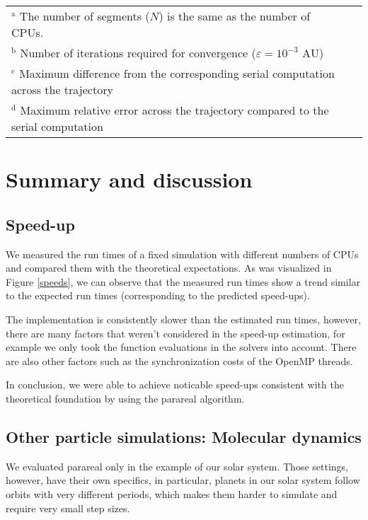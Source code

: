 \documentclass[conference]{IEEEtran}
\begin{document}
\begin{table*}[htbp]
\begin{center}
\begin{tabular}{crrrrrrrrrcc}
\bottomrule
\multicolumn{11}{l}{$^{\mathrm{a}}$ The number of segments ($N$) is the same as the number of CPUs.} \\
\multicolumn{11}{l}{$^{\mathrm{b}}$ Number of iterations required for convergence ($\varepsilon = 10^{-3}\text{ AU}$)} \\
\multicolumn{11}{l}{$^{\mathrm{c}}$ Maximum difference from the corresponding serial computation across the trajectory} \\
\multicolumn{11}{l}{$^{\mathrm{d}}$ Maximum relative error across the trajectory compared to the serial computation}
\end{tabular}
\label{runtimes}
\end{center}
\end{table*}

\section{Summary and discussion}

\subsection{Speed-up}
We measured the run times of a fixed simulation with different numbers of CPUs and compared them with the theoretical expectations. As was visualized in Figure \ref{speeds}, we can observe that the measured run times show a trend similar to the expected run times (corresponding to the predicted speed-ups). 

The implementation is consistently slower than the estimated run times, however, there are many factors that weren't considered in the speed-up estimation, for example we only took the function evaluations in the solvers into account. There are also other factors such as the synchronization costs of the OpenMP threads.

In conclusion, we were able to achieve noticable speed-ups consistent with the theoretical foundation by using the parareal algorithm.

\subsection{Other particle simulations: Molecular dynamics}
We evaluated parareal only in the example of our solar system. Those settings, however, have their own specifics, in particular, planets in our solar system follow orbits with very different periods, which makes them harder to simulate and require very small step sizes. 
\end{document}
